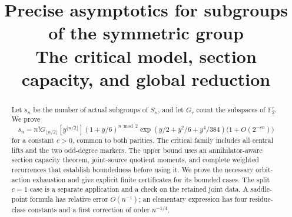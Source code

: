 \documentclass[11pt]{article}
\title{Precise asymptotics for subgroups of the symmetric group\\
\large The critical model, section capacity, and global reduction}
\author{}
\date{}
\numberwithin{equation}{section}
\theoremstyle{definition}
\theoremstyle{remark}
\newcommand{\F}{\mathbb F}
\begin{document}
\maketitle
\begin{abstract}
Let $s_n$ be the number of actual subgroups of $S_n$, and let
$G_r$ count the subspaces of $\F_2^r$. We prove
\[
 s_n=n!G_{\lfloor n/2\rfloor}[y^{\lfloor n/2\rfloor}]
 (1+y/6)^{n\bmod2}\exp(y/2+y^2/6+y^4/384)
 \bigl(1+O(2^{-cn})\bigr)
\]
for a constant $c>0$, common to both parities. The critical family includes
all central lifts and the two odd-degree markers. The upper bound uses an
annihilator-aware section capacity theorem, joint-source quotient moments,
and complete weighted recurrences that establish boundedness before using
it. We prove the necessary orbit-action exhaustion and give explicit
finite certificates for its bounded cases. The split $c=1$ case is a
separate application and a check on the retained joint data. A saddle-point
formula has relative error $O(n^{-1})$; an elementary expression has four
residue-class constants and a first correction of order $n^{-1/4}$.
\end{abstract}
\tableofcontents




































\appendix


\begingroup
\small


\endgroup
\end{document}
